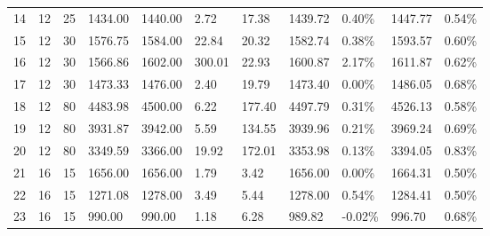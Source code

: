 \documentclass[../main]{subfiles}
\begin{document}
\begin{longtable}{l|ll|lll|lllll}
   14                  & 12                              & 25                     & 1434.00             & 1440.00  & 2.72          & 17.38                      & \cellcolor{green!25}1439.72 & 0.40\%  & 1447.77 & 0.54\% \\
   15                  & 12                              & 30                     & 1576.75             & 1584.00  & 22.84         & \cellcolor{green!25}20.32  & \cellcolor{green!25}1582.74 & 0.38\%  & 1593.57 & 0.60\% \\
   16                  & 12                              & 30                     & 1566.86             & 1602.00  & 300.01        & \cellcolor{green!25}22.93  & \cellcolor{green!25}1600.87 & 2.17\%  & 1611.87 & 0.62\% \\
   17                  & 12                              & 30                     & 1473.33             & 1476.00  & 2.40          & 19.79                      & \cellcolor{green!25}1473.40 & 0.00\%  & 1486.05 & 0.68\% \\
   18                  & 12                              & 80                     & 4483.98             & 4500.00  & 6.22          & 177.40                     & \cellcolor{green!25}4497.79 & 0.31\%  & 4526.13 & 0.58\% \\
   19                  & 12                              & 80                     & 3931.87             & 3942.00  & 5.59          & 134.55                     & \cellcolor{green!25}3939.96 & 0.21\%  & 3969.24 & 0.69\% \\
   20                  & 12                              & 80                     & 3349.59             & 3366.00  & 19.92         & 172.01                     & \cellcolor{green!25}3353.98 & 0.13\%  & 3394.05 & 0.83\% \\
   21                  & 16                              & 15                     & 1656.00             & 1656.00  & 1.79          & 3.42                       & \cellcolor{green!25}1656.00 & 0.00\%  & 1664.31 & 0.50\% \\
   22                  & 16                              & 15                     & 1271.08             & 1278.00  & 3.49          & 5.44                       & \cellcolor{green!25}1278.00 & 0.54\%  & 1284.41 & 0.50\% \\
   23                  & 16                              & 15                     & 990.00              & 990.00   & 1.18          & 6.28                       & 989.82                      & -0.02\% & 996.70  & 0.68\% \\

\end{longtable}
\end{document}
